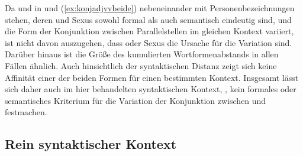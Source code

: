 \begin{exe}
	
\end{exe}

Da  und  in  und
(\ref{ex:konjadjvvbeide}) nebeneinander mit Personenbezeichnungen stehen, deren
 und Sexus sowohl formal als auch semantisch eindeutig sind, und die
Form der Konjunktion zwischen Parallelstellen im gleichen
Kontext variiert, ist nicht davon auszugehen, dass  oder Sexus die
Ursache für die Variation sind. Darüber hinaus ist die Größe des kumulierten
Wortformenabstands in allen Fällen ähnlich. Auch
hinsichtlich der syntaktischen Distanz zeigt sich
keine Affinität einer der beiden Formen für einen bestimmten Kontext. Insgesamt
lässt sich daher auch im hier behandelten syntaktischen Kontext,
, kein formales oder semantisches Kriterium
für die Variation der Konjunktion zwischen  und 
festmachen.


\subsection{Rein syntaktischer Kontext}
\label{subsec:kcbeidquantsyncont}


